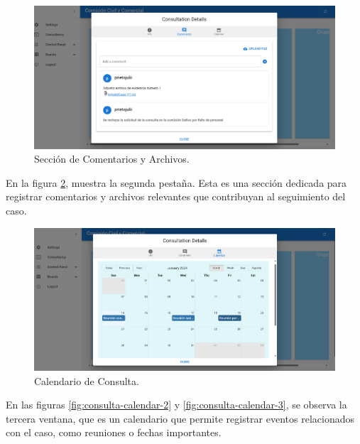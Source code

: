 \begin{figure}[H]
    \centering
    \includegraphics[width=1\linewidth]{fig/comentario-consulta.png}
    \caption{Sección de Comentarios y Archivos.}
    \label{fig:consulta-comentarios}
\end{figure}

En la figura \ref{fig:consulta-calendar-1}, muestra la segunda pestaña. Esta es una sección dedicada para registrar comentarios y archivos relevantes que contribuyan al seguimiento del caso.

\begin{figure}[H]
    \centering
    \includegraphics[width=1\linewidth]{fig/consulta-calendar-1.png}
    \caption{Calendario de Consulta.}
    \label{fig:consulta-calendar-1}
\end{figure}

En las figuras \ref{fig:consulta-calendar-2} y \ref{fig:consulta-calendar-3}, se observa la tercera ventana, que es un calendario que permite registrar eventos relacionados con el caso, como reuniones o fechas importantes.

